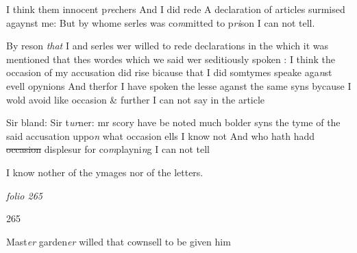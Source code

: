 \documentclass[12pt, a4paper]{book}
\begin{document}
				\marginpar[\vspace{0.5cm}{\textcolor{Gray}{9}}]{}
			

		\ifthenelse{\isodd{\thepage}}
		{\reversemarginpar}
		{\normalmarginpar}
		I think them innocent p\textit{re}chers And I did rede A declaration
of articles surmised agaynst me: But by whome serles was 
co\textit{m}mitted to p\textit{ri}son I can not tell. 
            		
				\marginpar[\vspace{0.5cm}{\textcolor{Gray}{10}}]{}
			

		\ifthenelse{\isodd{\thepage}}
		{\reversemarginpar}
		{\normalmarginpar}
		By reson \textit{that} I and serles wer willed to rede declarations
in the which it was mentioned that thes wordes which
we said wer seditiously spoken : I think the occasion of my 
accusation did rise bicause that I did somtymes speake aga\textit{n}st
evell opynions And therfor I have spoken the lesse aganst
the same syns bycause I wold avoid like occasion \& further I
can not say in the article
            		
				\marginpar[\vspace{0.5cm}{\textcolor{Gray}{11}}]{}
			

		\ifthenelse{\isodd{\thepage}}
		{\reversemarginpar}
		{\normalmarginpar}
		Sir bland: Sir t\textit{ur}ner: mr scory have be noted much bolder syns
the tyme of the said accusation uppo\textit{n} what occasion ells I know 
not And who hath hadd \sout{occasion} displesur for co\textit{m}playni\textit{n}g I can
not tell
            		
				\marginpar[\vspace{0.5cm}{\textcolor{Gray}{12}}]{}
			

		\ifthenelse{\isodd{\thepage}}
		{\reversemarginpar}
		{\normalmarginpar}
		I know nother of the ymages nor of the letters.

\dotfill
						\newpage
{}

\textit{folio 265}


 	\begin{flushright}{\color{Mahogany}265}\end{flushright}


				\marginpar[\vspace{0.5cm}{\textcolor{Gray}{32}}]{}
			

		\ifthenelse{\isodd{\thepage}}
		{\reversemarginpar}
		{\normalmarginpar}
		Mast\textit{er} garden\textit{er} willed that cownsell to be given him
 	
\end{document}
